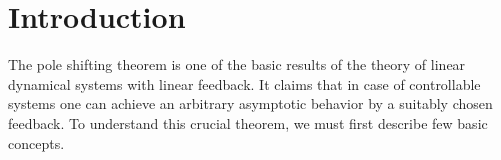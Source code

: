 \chapter*{Introduction}

The pole shifting theorem is one of the basic results of the theory of linear dynamical systems with linear feedback. It claims that in case of controllable systems one can achieve an arbitrary asymptotic behavior by a suitably chosen feedback. To understand this crucial theorem, we must first describe few basic concepts.